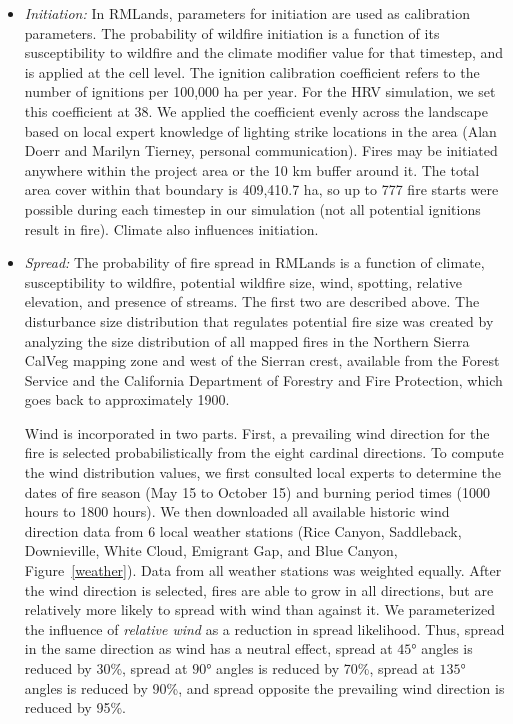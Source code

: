 \begin{itemize}
\item \emph{Initiation:} In RMLands, parameters for initiation are used as calibration parameters. The probability of wildfire initiation is a function of its susceptibility to wildfire and the climate modifier value for that timestep, and is applied at the cell level. The ignition calibration coefficient refers to the number of ignitions per 100,000 ha per year. For the HRV simulation, we set this coefficient at 38. We applied the coefficient evenly across the landscape based on local expert knowledge of lighting strike locations in the area (Alan Doerr and Marilyn Tierney, personal communication). Fires may be initiated anywhere within the project area or the 10 km buffer around it. The total area cover within that boundary is 409,410.7 ha, so up to 777 fire starts were possible during each timestep in our simulation (not all potential ignitions result in fire). Climate also influences initiation.


\item \emph{Spread:} The probability of fire spread in RMLands is a function of climate, susceptibility to wildfire, potential wildfire size, wind, spotting, relative elevation, and presence of streams. The first two are described above. The disturbance size distribution that regulates potential fire size was created by analyzing the size distribution of all mapped fires in the Northern Sierra CalVeg mapping zone and west of the Sierran crest, available from the Forest Service and the California Department of Forestry and Fire Protection, which goes back to approximately 1900. 

Wind is incorporated in two parts. First, a prevailing wind direction for the fire is selected probabilistically from the eight cardinal directions. To compute the wind distribution values, we first consulted local experts to determine the dates of fire season (May 15 to October 15) and burning period times (1000 hours to 1800 hours). We then downloaded all available historic wind direction data from 6 local weather stations (Rice Canyon, Saddleback, Downieville, White Cloud, Emigrant Gap, and Blue Canyon, Figure~\ref{weather}). Data from all weather stations was weighted equally. After the wind direction is selected, fires are able to grow in all directions, but are relatively more likely to spread with wind than against it. We parameterized the influence of \emph{relative wind} as a reduction in spread likelihood. Thus, spread in the same direction as wind has a neutral effect, spread at $\ang{45}$ angles is reduced by 30\%, spread at $\ang{90}$  angles is reduced by 70\%, spread at $\ang{135}$ angles is reduced by 90\%, and spread opposite the prevailing wind direction is reduced by 95\%. 


\end{itemize}
